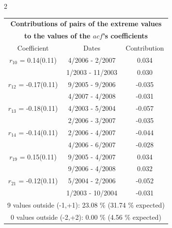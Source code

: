 
\thispagestyle{empty}
\begin{multicols}{2}{ 
\begin{tabular}{ccc}
\multicolumn{3}{c}{\textbf{Contributions of pairs of the extreme values} }  \vspace{-.10in}  \\ 
\multicolumn{3}{c}{ \textbf{to the values of the $acf$'s coefficients}} \\ 
\hline 
\hline                  Coefficient  &  Dates &  Contribution \\ 
\hline 
  $r_{10}$ = 0.14(0.11) &       4/2006 -  2/2007 &        0.034   \vspace{-.10in} \\  
&        1/2003 - 11/2003 &        0.030  \vspace{-.02in} \\ \hline 
  $r_{12}$ = -0.17(0.11) &       9/2005 -  9/2006 &       -0.035    \vspace{-.10in} \\ 
  &        4/2007 -  4/2008 &       -0.031  \vspace{-.02in}   \\ \hline 
    $r_{13}$ = -0.18(0.11) &       4/2003 -  5/2004 &       -0.057    \vspace{-.10in} \\ 
  &        2/2006 -  3/2007 &       -0.035  \vspace{-.02in}   \\ \hline 
    $r_{14}$ = -0.14(0.11) &       2/2006 -  4/2007 &       -0.044    \vspace{-.10in} \\ 
  &        4/2006 -  6/2007 &       -0.028  \vspace{-.02in}   \\ \hline 
    $r_{19}$ = 0.15(0.11) &       9/2005 -  4/2007 &        0.034   \vspace{-.10in} \\  
&        9/2006 -  4/2008 &        0.032  \vspace{-.02in} \\ \hline 
  $r_{21}$ = -0.12(0.11) &       5/2004 -  2/2006 &       -0.052    \vspace{-.10in} \\ 
  &        1/2003 - 10/2004 &       -0.031  \vspace{-.02in}   \\ \hline 
  \multicolumn{3}{c}{               9 values outside (-1,+1): 23.08  \% (31.74  \% expected)}\vspace{-.10in} \\ 
\multicolumn{3}{c}{               0 values outside (-2,+2):  0.00 \%  (4.56 \% expected) } \\
 \end{tabular} \\ 
 } 
\end{multicols} 
